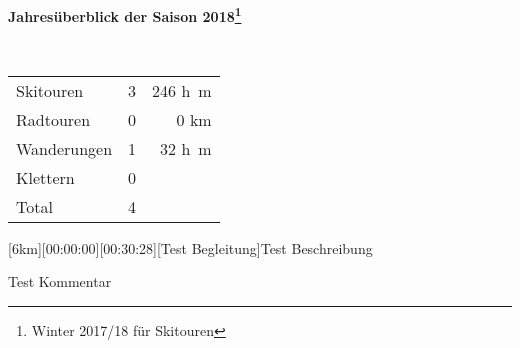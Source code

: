 \begin{center}{\Large \textbf{Jahres\"uberblick der Saison 2018\footnote{Winter 2017/18 f\"ur Skitouren}}} 

~

\begin{tabular}{lrr}
Skitouren & 3 & 246 \si{h\meter}\\
Radtouren & 0 & 0 \si{\kilo\meter}\\
Wanderungen & 1 & 32 \si{h\meter}\\
Klettern & 0&\\\hline
Total & 4 &
\end{tabular}\end{center}\newpage 
\begin{minipage}{\textwidth}[6km][00:00:00][00:30:28][Test Begleitung]\label{2018-05-04-Test 2}Test Beschreibung










 Test Kommentar









\end{minipage}
